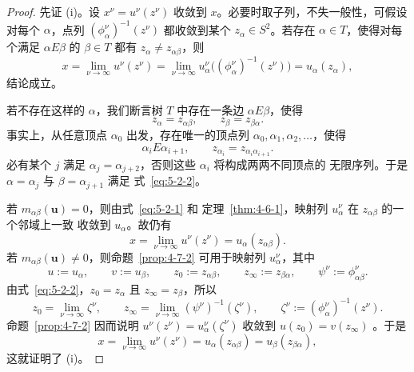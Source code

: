 \begin{proof}
先证 (i)。设 $x^\nu=u^\nu(z^\nu)$ 收敛到 $x$。必要时取子列，不失一般性，可假设
对每个 $\alpha$，点列 $(\phi_\alpha^\nu)^{-1}(z^\nu)$ 都收敛到某个
$z_\alpha\in S^2$。若存在 $\alpha\in T$，使得对每个满足 $\alpha E\beta$ 的
$\beta\in T$ 都有 $z_\alpha\ne z_{\alpha\beta}$，则
\[
  x=\lim_{\nu\to\infty}u^\nu(z^\nu)
   =\lim_{\nu\to\infty}
    u_\alpha^\nu\bigl((\phi_\alpha^\nu)^{-1}(z^\nu)\bigr)
   =u_\alpha(z_\alpha),
\]
结论成立。

若不存在这样的 $\alpha$，我们断言树 $T$ 中存在一条边 $\alpha E\beta$，使得
\begin{equation}\label{eq:5-2-2}
  z_\alpha=z_{\alpha\beta},
  \qquad z_\beta=z_{\beta\alpha}.
\end{equation}
事实上，从任意顶点 $\alpha_0$ 出发，存在唯一的顶点列
$\alpha_0,\alpha_1,\alpha_2,\ldots$，使得
\[
  \alpha_iE\alpha_{i+1},
  \qquad z_{\alpha_i}=z_{\alpha_i\alpha_{i+1}}.
\]
必有某个 $j$ 满足 $\alpha_j=\alpha_{j+2}$，否则这些 $\alpha_i$ 将构成两两不同顶点的
无限序列。于是 $\alpha=\alpha_j$ 与 $\beta=\alpha_{j+1}$ 满足
式~\eqref{eq:5-2-2}。

若 $m_{\alpha\beta}(\mathbf u)=0$，则由式~\eqref{eq:5-2-1} 和
定理~\ref{thm:4-6-1}，映射列 $u_\alpha^\nu$ 在 $z_{\alpha\beta}$ 的一个邻域上一致
收敛到 $u_\alpha$。故仍有
\[
  x=\lim_{\nu\to\infty}u^\nu(z^\nu)=u_\alpha(z_{\alpha\beta}).
\]
若 $m_{\alpha\beta}(\mathbf u)\ne0$，则命题~\ref{prop:4-7-2} 可用于映射列
$u_\alpha^\nu$，其中
\[
  u:=u_\alpha,
  \qquad v:=u_\beta,
  \qquad z_0:=z_{\alpha\beta},
  \qquad z_\infty:=z_{\beta\alpha},
  \qquad \psi^\nu:=\phi_{\alpha\beta}^\nu.
\]
由式~\eqref{eq:5-2-2}，$z_0=z_\alpha$ 且 $z_\infty=z_\beta$，所以
\[
  z_0=\lim_{\nu\to\infty}\zeta^\nu,
  \qquad
  z_\infty=\lim_{\nu\to\infty}(\psi^\nu)^{-1}(\zeta^\nu),
  \qquad
  \zeta^\nu:=(\phi_\alpha^\nu)^{-1}(z^\nu).
\]
命题~\ref{prop:4-7-2} 因而说明
$u^\nu(z^\nu)=u_\alpha^\nu(\zeta^\nu)$ 收敛到
$u(z_0)=v(z_\infty)$
。于是
\[
  x=\lim_{\nu\to\infty}u^\nu(z^\nu)
   =u_\alpha(z_{\alpha\beta})
   =u_\beta(z_{\beta\alpha}),
\]
这就证明了 (i)。


\end{proof}
